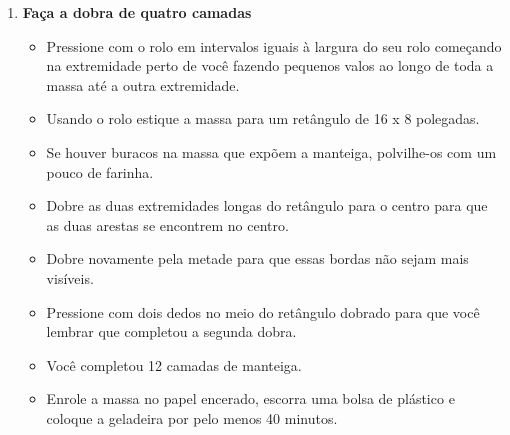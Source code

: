 \documentclass [11pt, letterpaper] {article}
\begin{document}
\begin {description}
\begin {enumerate}
\begin {itemize}
\item Gire a massa um quarto de volta para que o lado mais curto esteja na sua frente.
\end {itemize}
\item {\bf Faça a dobra de quatro camadas}
\begin {itemize}
\item Pressione com o rolo em intervalos iguais à largura do seu rolo começando na extremidade perto de você fazendo pequenos valos ao longo de toda a massa até a outra extremidade.
\item Usando o rolo estique a massa para um retângulo de 16 x 8 polegadas.
\item Se houver buracos na massa que expõem a manteiga, polvilhe-os com um pouco de farinha.
\item Dobre as duas extremidades longas do retângulo para o centro para que as duas arestas se encontrem no centro.
\item Dobre novamente pela metade para que essas bordas não sejam mais visíveis.
\item Pressione com dois dedos no meio do retângulo dobrado para que você lembrar que completou a segunda dobra.
\item Voc\^e completou 12 camadas de manteiga.
\item Enrole a massa no papel encerado, escorra uma bolsa de plástico e coloque a geladeira por pelo menos 40 minutos.
\end {itemize}



\end{enumerate}
\end{description}
\end{document}
